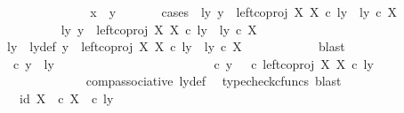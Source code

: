 \begin{isabellebody}
\ \ \ \ \ \ \isamarkupfalse%
\isanewline
\ \ \ \ \ \ \isamarkupfalse%
\ {\isachardoublequoteopen}x\ {\isacharequal}{\kern0pt}\ y{\isachardoublequoteclose}\isanewline
\ \ \ \ \ \ \isamarkupfalse%
{\isacharparenleft}{\kern0pt}cases\ {\isachardoublequoteopen}{\isasymexists}\ ly{\isachardot}{\kern0pt}\ y\ {\isacharequal}{\kern0pt}\ left{\isacharunderscore}{\kern0pt}coproj\ X\ X\ {\isasymcirc}\isactrlsub c\ ly\ {\isasymand}\ ly\ {\isasymin}\isactrlsub c\ X{\isachardoublequoteclose}{\isacharparenright}{\kern0pt}\isanewline
\ \ \ \ \ \ \ \ \isamarkupfalse%
\ {\isachardoublequoteopen}{\isasymexists}ly{\isachardot}{\kern0pt}\ y\ {\isacharequal}{\kern0pt}\ left{\isacharunderscore}{\kern0pt}coproj\ X\ X\ {\isasymcirc}\isactrlsub c\ ly\ {\isasymand}\ ly\ {\isasymin}\isactrlsub c\ X{\isachardoublequoteclose}\isanewline
\ \ \ \ \ \ \ \ \isamarkupfalse%
\ \isamarkupfalse%
\ ly\ \ ly{\isacharunderscore}{\kern0pt}def{\isacharcolon}{\kern0pt}\ {\isachardoublequoteopen}y\ {\isacharequal}{\kern0pt}\ left{\isacharunderscore}{\kern0pt}coproj\ X\ X\ {\isasymcirc}\isactrlsub c\ ly\ {\isasymand}\ ly\ {\isasymin}\isactrlsub c\ X{\isachardoublequoteclose}\isanewline
\ \ \ \ \ \ \ \ \ \ \isamarkupfalse%
\ blast\isanewline
\ \ \ \ \ \ \ \ \isamarkupfalse%
\ {\isachardoublequoteopen}{\isasymrho}\ {\isasymcirc}\isactrlsub c\ y\ {\isacharequal}{\kern0pt}\ {\isasymlangle}ly{\isacharcomma}{\kern0pt}\ {\isasymt}{\isasymrangle}{\isachardoublequoteclose}\isanewline
\ \ \ \ \ \ \ \ \isamarkupfalse%
\ {\isacharminus}{\kern0pt}\ \isanewline
\ \ \ \ \ \ \ \ \ \ \isamarkupfalse%
\ {\isachardoublequoteopen}{\isasymrho}\ {\isasymcirc}\isactrlsub c\ y\ {\isacharequal}{\kern0pt}\ {\isacharparenleft}{\kern0pt}{\isasymrho}\ {\isasymcirc}\isactrlsub c\ left{\isacharunderscore}{\kern0pt}coproj\ X\ X{\isacharparenright}{\kern0pt}\ {\isasymcirc}\isactrlsub c\ ly{\isachardoublequoteclose}\isanewline
\ \ \ \ \ \ \ \ \ \ \ \ \isamarkupfalse%
\ comp{\isacharunderscore}{\kern0pt}associative{}\ ly{\isacharunderscore}{\kern0pt}def\ \isamarkupfalse%
\ {\isacharparenleft}{\kern0pt}typecheck{\isacharunderscore}{\kern0pt}cfuncs{\isacharcomma}{\kern0pt}\ blast{\isacharparenright}{\kern0pt}\isanewline
\ \ \ \ \ \ \ \ \ \ \isamarkupfalse%
\ \isamarkupfalse%
\ {\isachardoublequoteopen}{\isachardot}{\kern0pt}{\isachardot}{\kern0pt}{\isachardot}{\kern0pt}\ {\isacharequal}{\kern0pt}\ {\isasymlangle}id\ X{\isacharcomma}{\kern0pt}\ {\isasymt}\ {\isasymcirc}\isactrlsub c\ {\isasymbeta}\isactrlbsub X\isactrlesub {\isasymrangle}\ \ {\isasymcirc}\isactrlsub c\ ly{\isachardoublequoteclose}\isanewline

\end{isabellebody}
